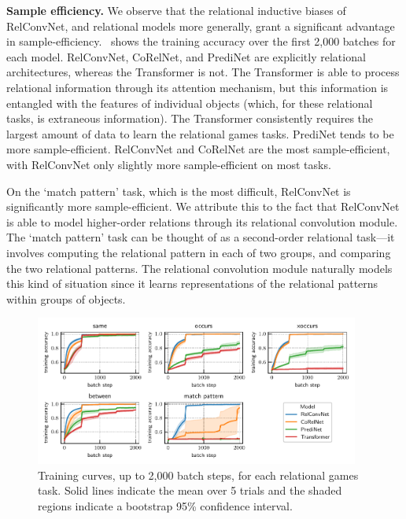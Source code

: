 \textbf{Sample efficiency.} We observe that the relational inductive biases of RelConvNet, and relational models more generally, grant a significant advantage in sample-efficiency.~ shows the training accuracy over the first 2,000 batches for each model. RelConvNet, CoRelNet, and PrediNet are explicitly relational architectures, whereas the Transformer is not. The Transformer is able to process relational information through its attention mechanism, but this information is entangled with the features of individual objects (which, for these relational tasks, is extraneous information). The Transformer consistently requires the largest amount of data to learn the relational games tasks. PrediNet tends to be more sample-efficient. RelConvNet and CoRelNet are the most sample-efficient, with RelConvNet only slightly more sample-efficient on most tasks.

On the `match pattern' task, which is the most difficult, RelConvNet is significantly more sample-efficient. We attribute this to the fact that RelConvNet is able to model higher-order relations through its relational convolution module. The `match pattern' task can be thought of as a second-order relational task---it involves computing the relational pattern in each of two groups, and comparing the two relational patterns. The relational convolution module naturally models this kind of situation since it learns representations of the relational patterns within groups of objects. %

\begin{figure}[t]
    \centering
    \includegraphics[width=0.95\textwidth]{figs/experiments/all_training_curves.pdf}
    \caption{Training curves, up to 2,000 batch steps, for each relational games task. Solid lines indicate the mean over 5 trials and the shaded regions indicate a bootstrap 95\% confidence interval.}\label{fig:training_curves}
\end{figure}

